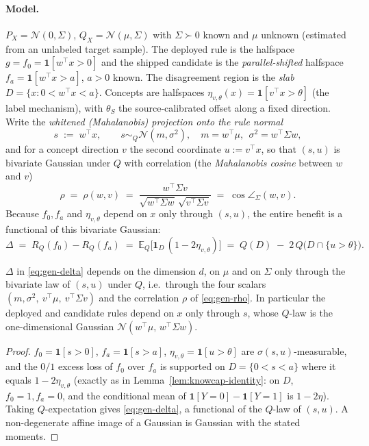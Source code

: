 \paragraph{Model.} $P_X=\mathcal N(0,\Sigma)$, $Q_X=\mathcal N(\mu,\Sigma)$ with
$\Sigma\succ0$ known and $\mu$ unknown (estimated from an unlabeled target sample).
The deployed rule is the halfspace $g=f_0=\mathbf 1[w^\top x>0]$ and the shipped
candidate is the \emph{parallel-shifted} halfspace $f_a=\mathbf 1[w^\top x>a]$,
$a>0$ known. The disagreement region is the \emph{slab}
$D=\{x:0<w^\top x<a\}$. Concepts are halfspaces
$\eta_{v,\theta}(x)=\mathbf 1[v^\top x>\theta]$ (the label mechanism), with
$\theta_S$ the source-calibrated offset along a fixed direction. Write the
\emph{whitened (Mahalanobis) projection onto the rule normal}
\begin{equation}\label{eq:gen-proj}
  s \;:=\; w^\top x,\qquad s\sim_Q \mathcal N(m,\sigma^2),\quad
  m=w^\top\mu,\ \ \sigma^2=w^\top\Sigma w,
\end{equation}
and for a concept direction $v$ the second coordinate $u:=v^\top x$, so that
$(s,u)$ is bivariate Gaussian under $Q$ with correlation (the \emph{Mahalanobis
cosine} between $w$ and $v$)
\begin{equation}\label{eq:gen-rho}
  \rho \;=\; \rho(w,v)\;=\;\frac{w^\top\Sigma v}{\sqrt{w^\top\Sigma w}\,\sqrt{v^\top\Sigma v}}
  \;=\;\cos\angle_\Sigma(w,v).
\end{equation}
Because $f_0,f_a$ and $\eta_{v,\theta}$ depend on $x$ only through $(s,u)$, the
entire benefit is a functional of this bivariate Gaussian:
\begin{equation}\label{eq:gen-delta}
  \Delta \;=\; R_Q(f_0)-R_Q(f_a)\;=\;\mathbb E_Q\big[\mathbf 1_D\,(1-2\eta_{v,\theta})\big]
        \;=\; Q(D)\;-\;2\,Q\big(D\cap\{u>\theta\}\big).
\end{equation}

\begin{lemma}\label{lem:gen-reduce}
$\Delta$ in \eqref{eq:gen-delta} depends on the dimension $d$, on $\mu$ and on
$\Sigma$ only through the bivariate law of $(s,u)$ under $Q$, i.e.\ through the four
scalars $(m,\sigma^2,\ v^\top\mu,\ v^\top\Sigma v)$ and the correlation $\rho$
of \eqref{eq:gen-rho}. In particular the deployed and candidate rules depend on $x$
only through $s$, whose $Q$-law is the one-dimensional Gaussian
$\mathcal N(w^\top\mu,\,w^\top\Sigma w)$.
\end{lemma}
\begin{proof}
$f_0=\mathbf 1[s>0]$, $f_a=\mathbf 1[s>a]$, $\eta_{v,\theta}=\mathbf 1[u>\theta]$ are
$\sigma(s,u)$-measurable, and the $0/1$ excess loss of $f_0$ over $f_a$ is supported
on $D=\{0<s<a\}$ where it equals $1-2\eta_{v,\theta}$ (exactly as in
Lemma~\ref{lem:knowcap-identity}: on $D$, $f_0{=}1,f_a{=}0$, and the conditional mean
of $\mathbf 1[Y{=}0]-\mathbf 1[Y{=}1]$ is $1-2\eta$). Taking $Q$-expectation gives
\eqref{eq:gen-delta}, a functional of the $Q$-law of $(s,u)$. A non-degenerate affine
image of a Gaussian is Gaussian with the stated moments.
\end{proof}

